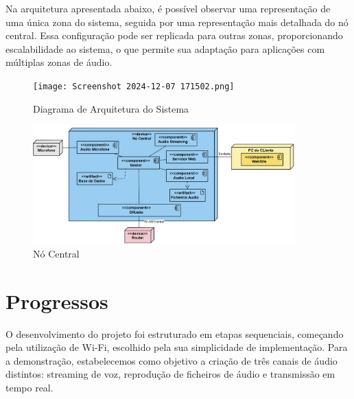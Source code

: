 \documentclass{article}
\begin{document}
Na arquitetura apresentada abaixo, é possível observar uma representação de uma única zona do sistema, seguida por uma representação mais detalhada do nó central. Essa configuração pode ser replicada para outras zonas, proporcionando escalabilidade ao sistema, o que permite sua adaptação para aplicações com múltiplas zonas de áudio.


\hspace{2cm}


\begin{figure}[h!] %
    \centering %
    \texttt{[image: Screenshot 2024-12-07 171502.png]} 
    \caption{Diagrama de Arquitetura do Sistema} %
    \label{fig:arquitetura} %
\end{figure}



\hspace{2cm}


\begin{figure}[h!] %
    \centering %
    \includegraphics[width=0.90\textwidth]{arq1.png} 
    \caption{Nó Central} %
    \label{fig:arquitetura} %
\end{figure}

\clearpage
\newpage



\section{Progressos}


O desenvolvimento do projeto foi estruturado em etapas sequenciais, começando pela utilização de Wi-Fi, escolhido pela sua simplicidade de implementação. Para a demonstração, estabelecemos como objetivo a criação de três canais de áudio distintos: streaming de voz, reprodução de ficheiros de áudio e transmissão em tempo real.
\end{document}
